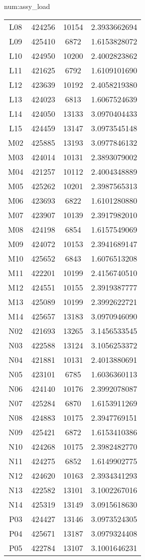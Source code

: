 \begin{numitem}{num:assy_load}
\begin{center}
\begin{longtable}{c c c c}
L08&424256&10154&2.3933662694\\
L09&425410&6872 &1.6153828072\\
L10&424950&10200&2.4002823862\\
L11&421625&6792 &1.6109101690\\
L12&423639&10192&2.4058219380\\
L13&424023&6813 &1.6067524639\\
L14&424050&13133&3.0970404433\\
L15&424459&13147&3.0973545148\\
M02&425885&13193&3.0977846132\\
M03&424014&10131&2.3893079002\\
M04&421257&10112&2.4004348889\\
M05&425262&10201&2.3987565313\\
M06&423693&6822 &1.6101280880\\
M07&423907&10139&2.3917982010\\
M08&424198&6854 &1.6157549069\\
M09&424072&10153&2.3941689147\\
M10&425652&6843 &1.6076513208\\
M11&422201&10199&2.4156740510\\
M12&424551&10155&2.3919387777\\
M13&425089&10199&2.3992622721\\
M14&425657&13183&3.0970946090\\
N02&421693&13265&3.1456533545\\
N03&422588&13124&3.1056253372\\
N04&421881&10131&2.4013880691\\
N05&423101&6785 &1.6036360113\\
N06&424140&10176&2.3992078087\\
N07&425284&6870 &1.6153911269\\
N08&424883&10175&2.3947769151\\
N09&425421&6872 &1.6153410386\\
N10&424268&10175&2.3982482770\\
N11&424275&6852 &1.6149902775\\
N12&424620&10163&2.3934341293\\
N13&422582&13101&3.1002267016\\
N14&425319&13149&3.0915618630\\
P03&424427&13146&3.0973524305\\
P04&425671&13187&3.0979324408\\
P05&422784&13107&3.1001646231\\

\end{longtable}
\end{center}
\end{numitem}
